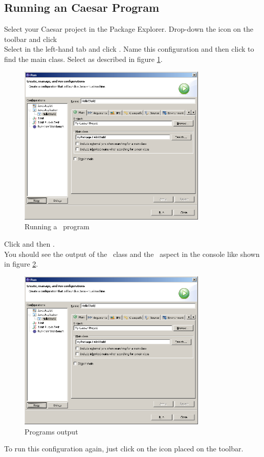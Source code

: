 \subsection{Running an Caesar Program}
Select your Caesar project in the Package Explorer. Drop-down the  icon on the toolbar and click \\
Select  in the left-hand tab and click .
Name this configuration  and then click  to find the main class. Select  as described in figure \ref{fig:run}.

\begin{figure}[htbp]
	\centering
		\includegraphics[width=0.80\textwidth]{images/run.png}
	\caption{Running a \caesarj ~program}
	\label{fig:run}
\end{figure}

Click  and then .\\
You should see the output of the  ~class and the  ~aspect in the console like shown in figure \ref{fig:console}.

\begin{figure}[htbp]
	\centering
		\includegraphics[width=0.80\textwidth]{images/run.png}
	\caption{Programs output}
	\label{fig:console}
\end{figure}
To run this configuration again, just click on the  icon placed on the toolbar.

